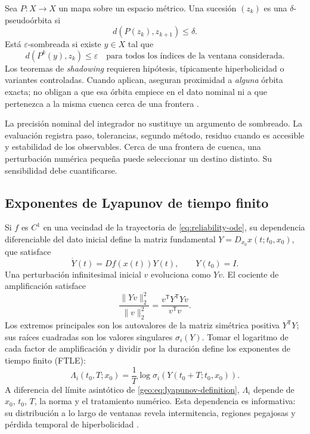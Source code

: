 Sea \(P:X\to X\) un mapa sobre un espacio métrico. Una sucesión
\((z_k)\) es una \(\delta\)-pseudoórbita si
\begin{equation}
 d(P(z_k),z_{k+1})\leq\delta .
 \label{eq:reliability-pseudo-orbit}
\end{equation}
Está \(\varepsilon\)-sombreada si existe \(y\in X\) tal que
\begin{equation}
 d(P^k(y),z_k)\leq\varepsilon
 \quad\text{para todos los índices de la ventana considerada}.
 \label{eq:reliability-shadowing}
\end{equation}
Los teoremas de \emph{shadowing} requieren hipótesis, típicamente
hiperbolicidad o variantes controladas. Cuando aplican, aseguran proximidad a
\emph{alguna} órbita exacta; no obligan a que esa órbita empiece en el dato
nominal ni a que pertenezca a la misma cuenca cerca de una frontera
\cite{Ott2002Chaos,VallejoSanjuan2017Predictability}.

La precisión nominal del integrador no sustituye un argumento de sombreado. La
evaluación registra paso, tolerancias, segundo método,
residuo cuando es accesible y estabilidad de los observables. Cerca de una
frontera de cuenca, una perturbación numérica pequeña puede seleccionar un
destino distinto. Su sensibilidad debe cuantificarse.

\subsection{Exponentes de Lyapunov de tiempo finito}

Si \(f\) es \(C^1\) en una vecindad de la trayectoria de
\cref{eq:reliability-ode}, su dependencia diferenciable del dato inicial
define la matriz fundamental \(Y=D_{x_0}x(t;t_0,x_0)\), que satisface
\begin{equation}
 \dot Y(t)=Df(x(t))Y(t),\qquad Y(t_0)=I.
 \label{eq:reliability-variational}
\end{equation}
Una perturbación infinitesimal inicial \(v\) evoluciona como \(Yv\).
El cociente de amplificación satisface
\[
 \frac{\|Yv\|_2^2}{\|v\|_2^2}
 =\frac{v^{\mathsf T}Y^{\mathsf T}Yv}{v^{\mathsf T}v}.
\]
Los extremos principales son los autovalores de la matriz simétrica positiva
\(Y^{\mathsf T}Y\); sus raíces cuadradas son los valores singulares
\(\sigma_i(Y)\). Tomar el logaritmo de cada factor de amplificación y
dividir por la duración define los exponentes de tiempo finito (FTLE):
\begin{equation}
 \Lambda_i(t_0,T;x_0)
 =\frac1T\log\sigma_i\!\left(Y(t_0+T;t_0,x_0)\right).
 \label{eq:reliability-ftle}
\end{equation}
A diferencia del límite asintótico de
\cref{geo:eq:lyapunov-definition}, \(\Lambda_i\) depende de \(x_0\), \(t_0\),
\(T\), la norma y el tratamiento numérico. Esta dependencia es informativa:
su distribución a lo largo de ventanas revela intermitencia, regiones
pegajosas y pérdida temporal de hiperbolicidad
\cite{VallejoSanjuan2017Predictability}.

